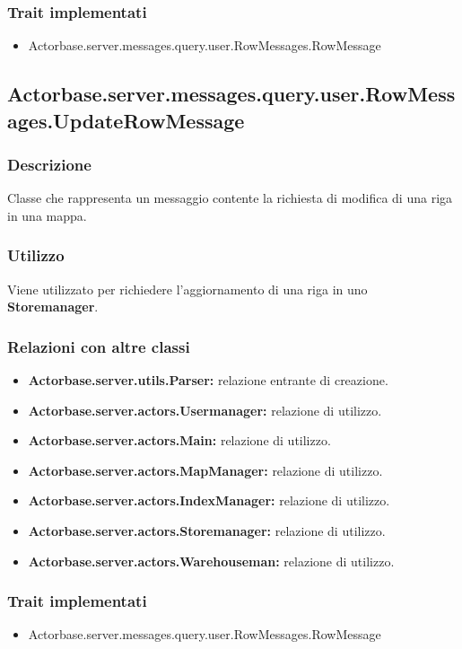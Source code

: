 \documentclass[a4paper]{article}
\begin{document}
			\subsubsection{Trait implementati}
				\begin{itemize}
					\item Actorbase.server.messages.query.user.RowMessages.RowMessage
				\end{itemize}
		
		\subsection{Actorbase.server.messages.query.user.RowMessages.UpdateRowMessage}
			\subsubsection{Descrizione}
				Classe che rappresenta un messaggio contente la richiesta di modifica di una riga in una mappa.
				
			\subsubsection{Utilizzo}
				Viene utilizzato per richiedere l'aggiornamento di una riga in uno \textbf{Storemanager}.
				
			\subsubsection{Relazioni con altre classi}
				\begin{itemize}
					\item \textbf{Actorbase.server.utils.Parser:} relazione entrante di creazione.
					\item \textbf{Actorbase.server.actors.Usermanager:} relazione di utilizzo.
					\item \textbf{Actorbase.server.actors.Main:} relazione di utilizzo.
					\item \textbf{Actorbase.server.actors.MapManager:} relazione di utilizzo.
					\item \textbf{Actorbase.server.actors.IndexManager:} relazione di utilizzo.
					\item \textbf{Actorbase.server.actors.Storemanager:} relazione di utilizzo.
					\item \textbf{Actorbase.server.actors.Warehouseman:} relazione di utilizzo.
				\end{itemize}
			\subsubsection{Trait implementati}
				\begin{itemize}
					\item Actorbase.server.messages.query.user.RowMessages.RowMessage
				\end{itemize}
				
\end{document}

